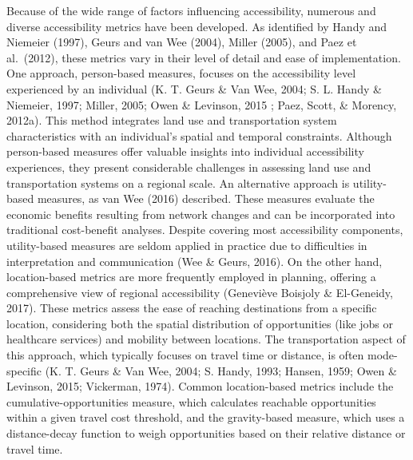\documentclass[12pt,twoside]{reedthesis}
\begin{document}
Because of the wide range of factors influencing accessibility, numerous and diverse accessibility metrics have been developed. As identified by Handy and Niemeier (1997), Geurs and van Wee (2004), Miller (2005), and Paez et al.~(2012), these metrics vary in their level of detail and ease of implementation. One approach, person-based measures, focuses on the accessibility level experienced by an individual (K. T. Geurs \& Van Wee, 2004; S. L. Handy \& Niemeier, 1997; Miller, 2005; Owen \& Levinson, 2015 ; Paez, Scott, \& Morency, 2012a). This method integrates land use and transportation system characteristics with an individual's spatial and temporal constraints. Although person-based measures offer valuable insights into individual accessibility experiences, they present considerable challenges in assessing land use and transportation systems on a regional scale. An alternative approach is utility-based measures, as van Wee (2016) described. These measures evaluate the economic benefits resulting from network changes and can be incorporated into traditional cost-benefit analyses. Despite covering most accessibility components, utility-based measures are seldom applied in practice due to difficulties in interpretation and communication (Wee \& Geurs, 2016).
On the other hand, location-based metrics are more frequently employed in planning, offering a comprehensive view of regional accessibility (Geneviève Boisjoly \& El-Geneidy, 2017). These metrics assess the ease of reaching destinations from a specific location, considering both the spatial distribution of opportunities (like jobs or healthcare services) and mobility between locations. The transportation aspect of this approach, which typically focuses on travel time or distance, is often mode-specific (K. T. Geurs \& Van Wee, 2004; S. Handy, 1993; Hansen, 1959; Owen \& Levinson, 2015; Vickerman, 1974). Common location-based metrics include the cumulative-opportunities measure, which calculates reachable opportunities within a given travel cost threshold, and the gravity-based measure, which uses a distance-decay function to weigh opportunities based on their relative distance or travel time.
\end{document}
